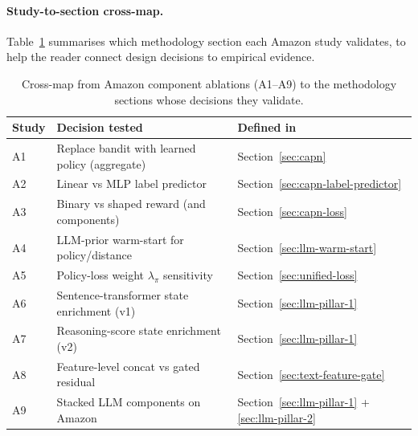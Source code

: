 \paragraph{Study-to-section cross-map.} Table~\ref{tab:ablation-crossmap} summarises which methodology section each Amazon study validates, to help the reader connect design decisions to empirical evidence.

\begin{table}[h!]
\centering
\begin{tabular}{|l|l|l|}
\hline
\textbf{Study} & \textbf{Decision tested} & \textbf{Defined in} \\
\hline
A1 & Replace bandit with learned policy (aggregate) & Section~\ref{sec:capn} \\
A2 & Linear vs MLP label predictor                  & Section~\ref{sec:capn-label-predictor} \\
A3 & Binary vs shaped reward (and components)       & Section~\ref{sec:capn-loss} \\
A4 & LLM-prior warm-start for policy/distance       & Section~\ref{sec:llm-warm-start} \\
A5 & Policy-loss weight $\lambda_\pi$ sensitivity   & Section~\ref{sec:unified-loss} \\
A6 & Sentence-transformer state enrichment (v1)     & Section~\ref{sec:llm-pillar-1} \\
A7 & Reasoning-score state enrichment (v2)          & Section~\ref{sec:llm-pillar-1} \\
A8 & Feature-level concat vs gated residual         & Section~\ref{sec:text-feature-gate} \\
A9 & Stacked LLM components on Amazon               & Section~\ref{sec:llm-pillar-1} + \ref{sec:llm-pillar-2} \\
\hline
\end{tabular}
\caption{Cross-map from Amazon component ablations (A1--A9) to the methodology sections whose decisions they validate.}
\label{tab:ablation-crossmap}
\end{table}


\clearpage
